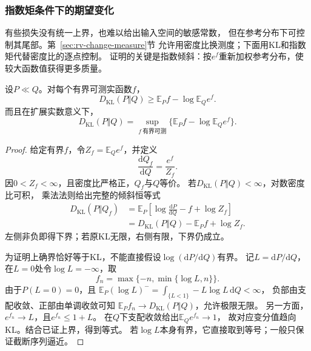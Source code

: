\subsubsection{指数矩条件下的期望变化}
\label{sec:information-change-measure}

有些损失没有统一上界，也难以给出输入空间的敏感常数，
但在参考分布下可控制其尾部。第~\ref{sec:rv-change-measure}节
允许用密度比换测度；下面用KL和指数矩代替密度比的逐点控制。
证明的关键是指数倾斜：按\(e^f\)重新加权参考分布，使较大函数值获得更多质量。

\begin{theorem}
\label{thm:information-donsker-varadhan}
设\(P\ll Q\)。对每个有界可测实函数\(f\)，
\begin{equation}
  D_{\mathrm{KL}}(P\Vert Q)
  \geq\mathbb E_Pf-\log\mathbb E_Qe^f.
  \label{eq:information-dv-lower}
\end{equation}
而且在扩展实数意义下，
\begin{equation}
  D_{\mathrm{KL}}(P\Vert Q)
  =\sup_{f\ \text{有界可测}}\{\mathbb E_Pf-\log\mathbb E_Qe^f\}.
  \label{eq:information-dv-variational}
\end{equation}
\end{theorem}
\begin{proof}
给定有界\(f\)，令\(Z_f=\mathbb E_Qe^f\)，并定义
\[
  \frac{\mathrm dQ_f}{\mathrm dQ}=\frac{e^f}{Z_f}.
\]
因\(0<Z_f<\infty\)，且密度比严格正，\(Q_f\)与\(Q\)等价。
若\(D_{\mathrm{KL}}(P\Vert Q)<\infty\)，对数密度比可积，
乘法法则给出完整的倾斜恒等式
\[
\begin{aligned}
  D_{\mathrm{KL}}(P\Vert Q_f)
  &=\mathbb E_P\left[\log\frac{\mathrm dP}{\mathrm dQ}-f+\log Z_f\right]\\
  &=D_{\mathrm{KL}}(P\Vert Q)-\mathbb E_Pf+\log Z_f.
\end{aligned}
\]
左侧非负即得下界；若原KL无限，右侧有限，下界仍成立。

为证明上确界恰好等于KL，不能直接假设\(\log(\mathrm dP/\mathrm dQ)\)有界。
记\(L=\mathrm dP/\mathrm dQ\)，在\(L=0\)处令\(\log L=-\infty\)，取
\[
  f_n=\max\{-n,\min\{\log L,n\}\}.
\]
由于\(P(L=0)=0\)，且
\(\mathbb E_P(\log L)^-=\int_{\{L<1\}}-L\log L\,\mathrm dQ<\infty\)，
负部由支配收敛、正部由单调收敛可知
\(\mathbb E_Pf_n\to D_{\mathrm{KL}}(P\Vert Q)\)，允许极限无限。
另一方面，\(e^{f_n}\to L\)，且\(e^{f_n}\leq1+L\)。
在\(Q\)下支配收敛给出\(\mathbb E_Qe^{f_n}\to1\)，
故对应变分值趋向KL。结合已证上界，得到等式。
若\(\log L\)本身有界，它直接取到等号；一般只保证截断序列逼近。
\end{proof}

